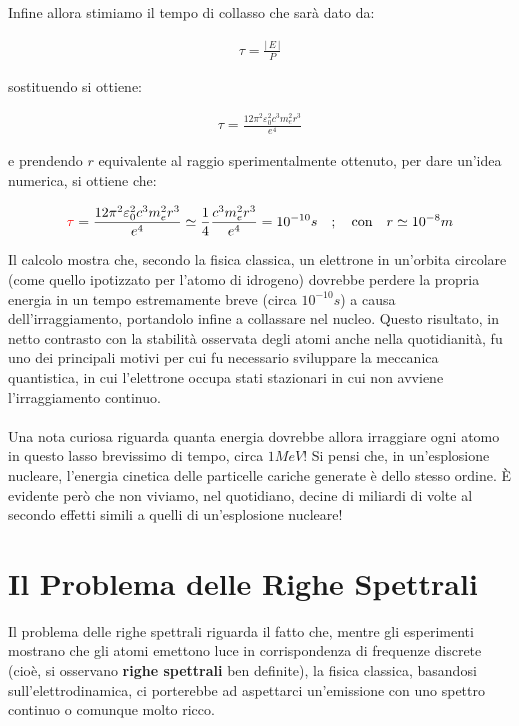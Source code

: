 	Infine allora stimiamo il tempo di collasso che sarà dato da:
	
\begin{align*}
	\tau = \frac{|\, E \,|}{P} 
\end{align*}

	sostituendo si ottiene:

\begin{align*}
	\tau = \frac{12\pi^2\varepsilon_0^2 c^3 m_e^2 r^3}{e^4}
\end{align*}

	e prendendo $r$ equivalente al raggio sperimentalmente ottenuto, per dare un'idea numerica, si ottiene che:

\begin{nb}
\begin{align*}
	\textcolor{red}{\tau} = \frac{12\pi^2\varepsilon_0^2 c^3 m_e^2 r^3}{e^4} \simeq \frac{1}{4}\frac{ c^3 m_e^2 r^3}{e^4} = 10^{-10} s \quad ; \quad \text{con \, \,} r \simeq 10^{-8}m
\end{align*}
\end{nb}

	Il calcolo mostra che, secondo la fisica classica, un elettrone in un'orbita circolare (come quello ipotizzato per l'atomo di idrogeno) dovrebbe perdere la propria energia in un tempo estremamente breve (circa $10^{-10}s$) a causa dell'irraggiamento, portandolo infine a collassare nel nucleo. Questo risultato, in netto contrasto con la stabilità osservata degli atomi anche nella quotidianità, fu uno dei principali motivi per cui fu necessario sviluppare la meccanica quantistica, in cui l'elettrone occupa stati stazionari in cui non avviene l'irraggiamento continuo.
	\\
	\\
	Una nota curiosa riguarda quanta energia dovrebbe allora irraggiare ogni atomo in questo lasso brevissimo di tempo, circa $1MeV$! Si pensi che, in un'esplosione nucleare, l'energia cinetica delle particelle cariche generate è dello stesso ordine. È evidente però che non viviamo, nel quotidiano, decine di miliardi di volte al secondo effetti simili a quelli di un'esplosione nucleare!
	
\section{Il Problema delle Righe Spettrali}

	Il problema delle righe spettrali riguarda il fatto che, mentre gli esperimenti mostrano che gli atomi emettono luce in corrispondenza di frequenze discrete (cioè, si osservano \textbf{righe spettrali} ben definite), la fisica classica, basandosi sull'elettrodinamica, ci porterebbe ad aspettarci un'emissione con uno spettro continuo o comunque molto ricco.

